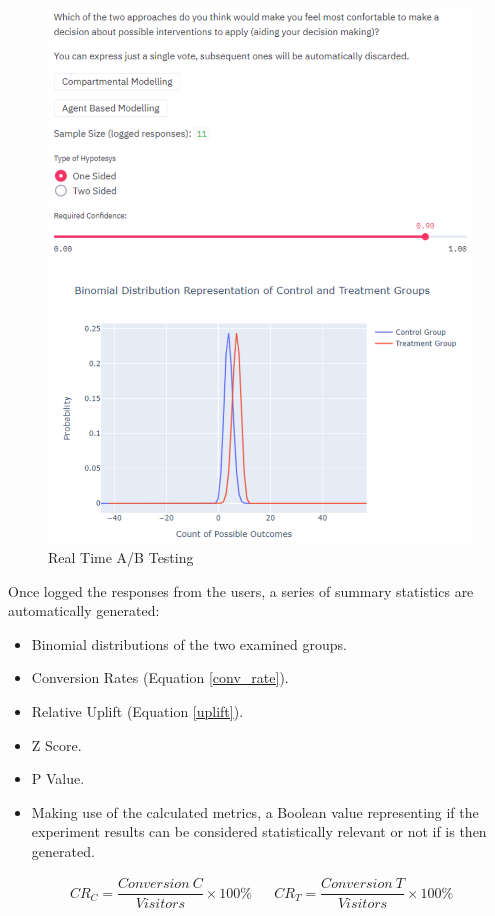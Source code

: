 \begin{figure}[ht!]%
    \centering
    \includegraphics[width=0.85\linewidth]{latex/images/ab_live.pdf}
    \caption{Real Time A/B Testing}
    \label{liveab}
\end{figure}

Once logged the responses from the users, a series of summary statistics are automatically generated:
\begin{itemize}
    \setlength\itemsep{-0.3cm}
    \item Binomial distributions of the two examined groups.
    \item Conversion Rates (Equation \ref{conv_rate}).
    \item Relative Uplift (Equation \ref{uplift}).
    \item Z Score.
    \item P Value. 
    \item Making use of the calculated metrics, a Boolean value representing if the experiment results can be considered statistically relevant or not if is then generated.
\end{itemize}

\useshortskip
\begin{align}
\ CR_{C} = \dfrac{Conversion\:C}{Visitors}\times100\% && CR_{T} = \dfrac{Conversion\:T}{Visitors}\times100\%
\label{conv_rate}
\end{align}
\useshortskip

